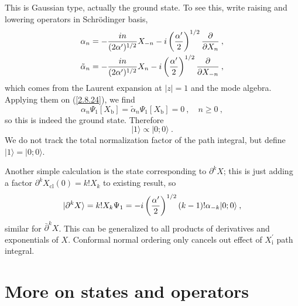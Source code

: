 This is Gaussian type, actually the ground state.    
To see this, write raising and lowering operators in Schrödinger basis,    
\begin{subequations} \label{2.8.25}
	\begin{align}
		\alpha_{n}=-\frac{i n}{(2 \alpha^{\prime})^{1 / 2}} X_{-n}-i\left(\frac{\alpha^{\prime}}{2}\right)^{1 / 2} \frac{\partial}{\partial X_{n}} \:, \label{2.8.25a} \\
		\tilde{\alpha}_{n}=-\frac{i n}{(2 \alpha^{\prime})^{1 / 2}} X_{n}-i\left(\frac{\alpha^{\prime}}{2}\right)^{1 / 2} \frac{\partial}{\partial X_{-n}} \:, \label{2.8.25b} 
	\end{align}
\end{subequations} 
which comes from the Laurent expansion at $|z|=1$ and the mode algebra. Applying them on (\ref{2.8.24}), we find    
\begin{equation}
	\alpha_{n} \Psi_{1} [X_{\mathrm{b}}]=\tilde{\alpha}_{n} \Psi_{1}[X_{\mathrm{b}}]=0\:, \quad n \geq 0 \:, \label{2.8.26}
\end{equation}
so this is indeed the ground state. Therefore    
\begin{equation}
	|1\rangle \propto|0 ; 0\rangle \:. \label{2.8.27}
\end{equation}
We do not track the total normalization factor of the path integral, but define $|1\rangle =|0 ; 0\rangle$.    

Another simple calculation is the state corresponding to $\partial^{k} X$; this is just adding a factor $\partial^{k} X_{\mathrm{cl}}(0)=k ! X_{k}$ to existing result, so    
\begin{equation}
	\lvert \partial^{k} X \rangle=k ! X_{k} \Psi_{1}=-i\left(\frac{\alpha^{\prime}}{2}\right)^{1 / 2}(k-1) !
	\alpha_{-k}|0 ; 0\rangle \:, \label{2.8.28}
\end{equation}
similar for $\bar{\partial}^{k} X$. This can be generalized to all products of derivatives and exponentials of $X$. Conformal normal ordering only cancels out effect of $X_\mathrm{i}^\prime$ path integral.    

\section{\texorpdfstring{More on states and operators}{2.9 More on states and operators}} \label{sec:2.9}

